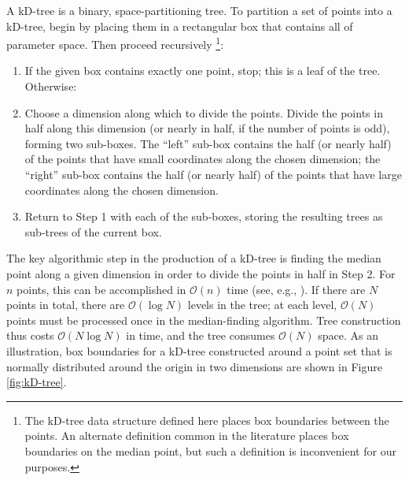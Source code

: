 \documentclass{iopart}
\newcommand{\order}[1]{\mathcal{O}\left( #1 \right)}
\begin{document}
A kD-tree is a binary, space-partitioning tree.  To partition a set of
points into a kD-tree, begin by placing them in a rectangular box that
contains all of parameter space.  Then proceed recursively%
\footnote{The kD-tree data structure defined here places box boundaries
  between the points.  An alternate definition common in the
  literature places box boundaries on the median point, but such a
  definition is inconvenient for our purposes.}: %
\begin{enumerate}
\item If the given box contains exactly one point, stop; this is a
  leaf of the tree.  Otherwise:
\item Choose a dimension along which to divide the points.  Divide the
  points in half along this dimension (or nearly in half, if the
  number of points is odd), forming two sub-boxes.  The ``left''
  sub-box contains the half (or nearly half) of the points that have
  small coordinates along the chosen dimension; the ``right'' sub-box
  contains the half (or nearly half) of the points that have large
  coordinates along the chosen dimension.
\item Return to Step 1 with each of the sub-boxes, storing the
  resulting trees as sub-trees of the current box.
\end{enumerate}
The key algorithmic step in the production of a kD-tree is finding the
median point along a given dimension in order to divide the points in
half in Step 2.  For $n$ points, this can be accomplished in
$\order{n}$ time (see, e.g., \cite{Press2007}).  If there are $N$
points in total, there are $\order{\log N}$ levels in the tree; at
each level, $\order{N}$ points must be processed once in the
median-finding algorithm.  Tree construction thus costs $\order{N \log
  N}$ in time, and the tree consumes $\order{N}$ space.  As an
illustration, box boundaries for a kD-tree constructed around a point
set that is normally distributed around the origin in two dimensions
are shown in Figure \ref{fig:kD-tree}.
\end{document}
